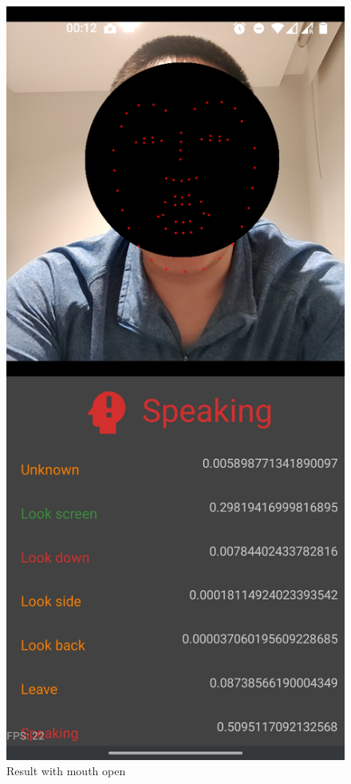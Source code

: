 \begin{minipage}{.5\textwidth}
\begin{figure}[H]
    \centering
    \includegraphics[width=\textwidth]{appendix/imgs/app-core-func1.jpg}
    \caption{Result with mouth open}
    \label{fig:app-core-func1}
\end{figure}
\end{minipage}

